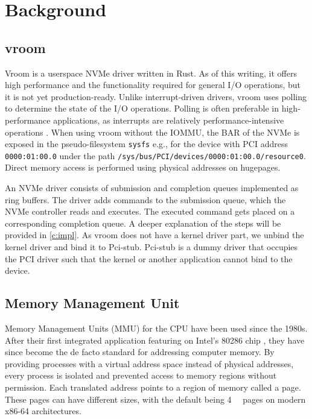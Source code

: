 \chapter{Background}

\section{vroom}
Vroom is a userspace NVMe driver written in Rust. As of this writing, it offers high performance and the functionality required for general I/O operations, but it is not yet production-ready. Unlike interrupt-driven drivers, vroom uses polling to determine the state of the I/O operations. Polling is often preferable in high-performance applications, as interrupts are relatively performance-intensive operations \cite{spdksubmitting}.
When using vroom without the IOMMU, the BAR of the NVMe is exposed in the pseudo-filesystem \texttt{sysfs} e.g., for the device with PCI address \texttt{0000:01:00.0} under the path \texttt{/sys/bus/PCI/devices/0000:01:00.0/resource0}. Direct memory access is performed using physical addresses on hugepages.

An NVMe driver consists of submission and completion queues implemented as ring buffers. The driver adds commands to the submission queue, which the NVMe controller reads and executes. The executed command gets placed on a corresponding completion queue. A deeper explanation of the steps will be provided in \autoref{c:impl}.
As vroom does not have a kernel driver part, we unbind the kernel driver and bind it to Pci-stub. Pci-stub is a dummy driver that occupies the PCI driver such that the kernel or another application cannot bind to the device.

\section{Memory Management Unit}
Memory Management Units (MMU) for the CPU have been used since the 1980s. After their first integrated application featuring on Intel's 80286 chip \cite{intel80286}, they have since become the de facto standard for addressing computer memory. By providing processes with a virtual address space instead of physical addresses, every process is isolated and prevented access to memory regions without permission. Each translated address points to a region of memory called a page. These pages can have different sizes, with the default being \qty{4}{\kibi\byte} pages on modern x86-64 architectures.

